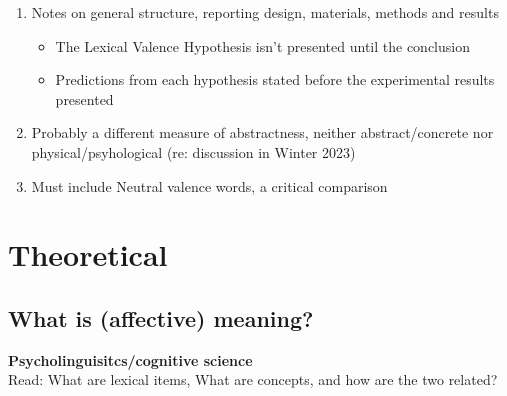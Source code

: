 \documentclass[12pt,letterpaper,table,svgnames,dvipsnames]{article}
\begin{document}
\begin{enumerate}
\begin{enumerate}
    \end{enumerate}

    \item Notes on general structure, reporting design, materials, methods and results
        \begin{itemize}
            \item The Lexical Valence Hypothesis isn't presented until the conclusion

            \item Predictions from each hypothesis stated before the experimental results presented
        \end{itemize}

    \item Probably a different measure of abstractness, neither abstract/concrete nor physical/psyhological (re: discussion in Winter 2023)

    \item Must include Neutral valence words, a critical comparison

\end{enumerate}



\section{Theoretical}

\subsection{What is (affective) meaning?}

\noindent \textbf{Psycholinguisitcs/cognitive science}\\
Read: What are lexical items, What are concepts, and how are the two related?
\end{document}
